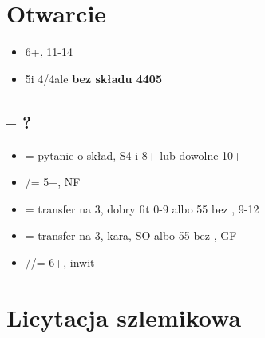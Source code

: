 \documentclass[12pt]{article}
\begin{document}
\newpage
\section{Otwarcie \texorpdfstring{\Cs[2]}{2C}}
\begin{itemize}
    \item 6+\Cs, 11-14
    \item 5\Cs[] i 4\Hs/4\Ss[] ale \textbf{bez składu 4405}
\end{itemize}
\subsection{\texorpdfstring{\Cs[2] – ?}{1C – ?}}
\begin{itemize}
    \item \Ds[2] = pytanie o skład, S4 i 8+ lub dowolne 10+
    \item \Hs[2]/\Ss[] = 5+, NF
    \item \NT[2] = transfer na 3\Cs, dobry fit 0-9 albo 55 bez \Cs, 9-12
    \item \Cs[3] = transfer na 3\Ds, kara, SO albo 55 bez \Cs, GF
    \item \Ds[3]/\Hs/\Ss[] = 6+, inwit
\end{itemize}

\newpage
\section{Licytacja szlemikowa}
\end{document}
